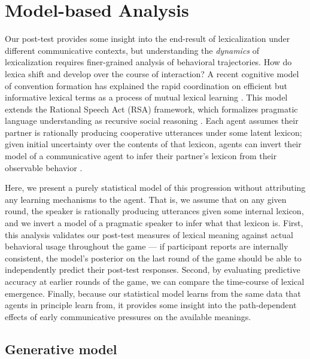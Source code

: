 \documentclass[10pt,letterpaper]{article}
\begin{document}
\section{Model-based Analysis}

Our post-test provides some insight into the end-result of lexicalization under different communicative contexts, but understanding the \emph{dynamics} of lexicalization requires finer-grained analysis of behavioral trajectories. How do lexica shift and develop over the course of interaction? A recent cognitive model of convention formation has explained the rapid coordination on efficient but informative lexical terms as a process of mutual lexical learning \cite{HawkinsFrankGoodman17_ConventionFormation}. This model extends the Rational Speech Act (RSA) framework, which formalizes pragmatic language understanding as recursive social reasoning \cite{FrankGoodman12_PragmaticReasoningLanguageGames,GoodmanFrank16_RSATiCS}. Each agent assumes their partner is rationally producing cooperative utterances under some latent lexicon; given initial uncertainty over the contents of that lexicon, agents can invert their model of a communicative agent to infer their partner's lexicon from their observable behavior \cite{BergenLevyGoodman16_LexicalUncertainty}. 

Here, we present a purely statistical model of this progression without attributing any learning mechanisms to the agent. That is, we assume that on any given round, the speaker is rationally producing utterances given some internal lexicon, and we invert a model of a pragmatic speaker to infer what that lexicon is. First, this analysis validates our post-test measures of lexical meaning against actual behavioral usage throughout the game --- if participant reports are internally consistent, the model's posterior on the last round of the game should be able to independently predict their post-test responses. Second, by evaluating predictive accuracy at earlier rounds of the game, we can compare the time-course of lexical emergence. Finally, because our statistical model learns from the same data that agents in principle learn from, it provides some insight into the path-dependent effects of early communicative pressures on the available meanings. %

\subsection{Generative model}
\end{document}
